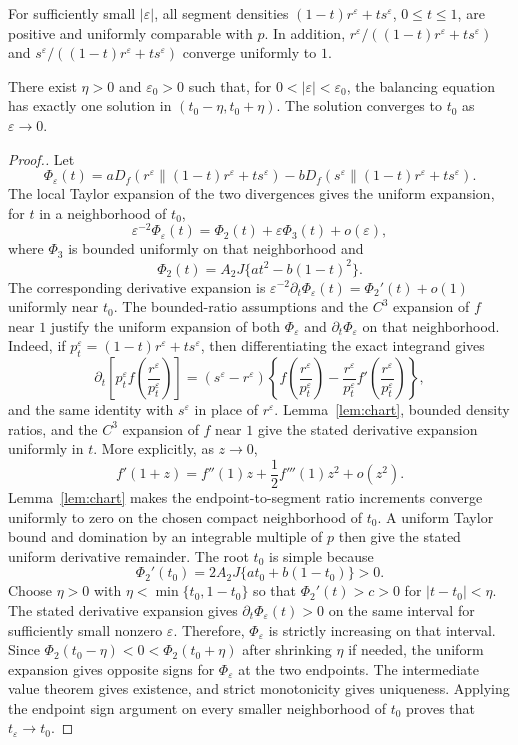 \documentclass[10pt,a4paper]{amsart}
\newcommand{\eps}{\varepsilon}
\begin{document}
\begin{lemma}\label{lem:chart}
For sufficiently small $|\eps|$, all segment densities $(1-t)r^\eps+ts^\eps$, $0\le t\le1$, are positive and uniformly comparable with $p$. In addition, $r^\eps/((1-t)r^\eps+ts^\eps)$ and $s^\eps/((1-t)r^\eps+ts^\eps)$ converge uniformly to $1$.
\end{lemma}

\begin{lemma}\label{lem:root}
There exist $\eta>0$ and $\eps_0>0$ such that, for $0<|\eps|<\eps_0$, the balancing equation has exactly one solution in $(t_0-\eta,t_0+\eta)$. The solution converges to $t_0$ as $\eps\to0$.
\end{lemma}

\begin{proof}[Proof.]
Let
\[
\Phi_\eps(t)=aD_f(r^\eps\|(1-t)r^\eps+ts^\eps)-bD_f(s^\eps\|(1-t)r^\eps+ts^\eps).
\]
The local Taylor expansion of the two divergences gives the uniform expansion, for $t$ in a neighborhood of $t_0$,
\[
\eps^{-2}\Phi_\eps(t)= \Phi_2(t)+\eps\Phi_3(t)+o(\eps),
\]
where $\Phi_3$ is bounded uniformly on that neighborhood and
\[
\Phi_2(t)=A_2J\{at^2-b(1-t)^2\}.
\]
The corresponding derivative expansion is
$\eps^{-2}\partial_t\Phi_\eps(t)= \Phi_2'(t)+o(1)$
uniformly near $t_0$. The bounded-ratio assumptions and the $C^3$ expansion of $f$ near $1$ justify the uniform expansion of both $\Phi_\eps$ and $\partial_t\Phi_\eps$ on that neighborhood. Indeed, if $p_t^\eps=(1-t)r^\eps+ts^\eps$, then differentiating the exact integrand gives
\[
\partial_t\left[p_t^\eps f\left(\frac{r^\eps}{p_t^\eps}\right)\right]
=(s^\eps-r^\eps)\left\{f\left(\frac{r^\eps}{p_t^\eps}\right)
-\frac{r^\eps}{p_t^\eps}f'\left(\frac{r^\eps}{p_t^\eps}\right)\right\},
\]
and the same identity with $s^\eps$ in place of $r^\eps$. Lemma~\ref{lem:chart}, bounded density ratios, and the $C^3$ expansion of $f$ near $1$ give the stated derivative expansion uniformly in $t$.
More explicitly, as $z\to0$,
\[
f'(1+z)=f''(1)z+\frac12f'''(1)z^2+o(z^2).
\]
Lemma~\ref{lem:chart} makes the endpoint-to-segment ratio increments converge uniformly to zero on the chosen compact neighborhood of $t_0$. A uniform Taylor bound and domination by an integrable multiple of $p$ then give the stated uniform derivative remainder.
The root $t_0$ is simple because
\[
\Phi_2'(t_0)=2A_2J\{at_0+b(1-t_0)\}>0.
\]
Choose $\eta>0$ with $\eta<\min\{t_0,1-t_0\}$ so that $\Phi_2'(t)>c>0$ for $|t-t_0|<\eta$. The stated derivative expansion gives $\partial_t\Phi_\eps(t)>0$ on the same interval for sufficiently small nonzero $\eps$. Therefore, $\Phi_\eps$ is strictly increasing on that interval. Since $\Phi_2(t_0-\eta)<0<\Phi_2(t_0+\eta)$ after shrinking $\eta$ if needed, the uniform expansion gives opposite signs for $\Phi_\eps$ at the two endpoints. The intermediate value theorem gives existence, and strict monotonicity gives uniqueness. Applying the endpoint sign argument on every smaller neighborhood of $t_0$ proves that $t_\eps\to t_0$.
\end{proof}
\end{document}
